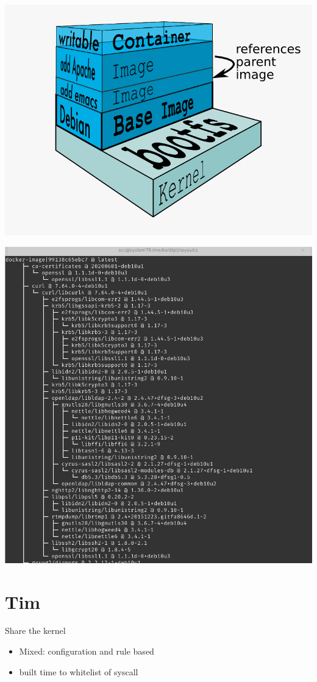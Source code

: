 \documentclass{beamer}
\begin{document}
\begin{CJK*}{UTF8}{bsmi}
  \begin{frame}
    \centering
    \begin{multicols*}{2}
      
      \includegraphics[width=.45\textwidth]{layers.png}
    \end{multicols*}
  \end{frame}

  \begin{frame}
    \centering
    \includegraphics[height=\textheight]{Screenshot_2021-07-23_12-02-42.png}
  \end{frame}

  \section{Tim}
  \begin{frame}{Share the kernel}
    \begin{itemize}
      \item Mixed: configuration and rule based
      \item built time to whitelist of syscall
    \end{itemize}
  \end{frame}


\end{CJK*}
\end{document}
